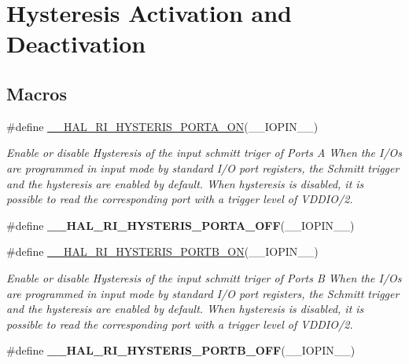 \hypertarget{group___r_i___hyst_config}{\section{Hysteresis Activation and Deactivation}
\label{group___r_i___hyst_config}
}
\subsection*{Macros}
\begin{DoxyCompactItemize}
\item 
\#define \hyperlink{group___r_i___hyst_config_gaae52b285744a36800f8493c58972b8a6}{\-\_\-\-\_\-\-H\-A\-L\-\_\-\-R\-I\-\_\-\-H\-Y\-S\-T\-E\-R\-I\-S\-\_\-\-P\-O\-R\-T\-A\-\_\-\-O\-N}(\-\_\-\-\_\-\-I\-O\-P\-I\-N\-\_\-\-\_\-)
\begin{DoxyCompactList}\small\item\em Enable or disable Hysteresis of the input schmitt triger of Ports A When the I/\-Os are programmed in input mode by standard I/\-O port registers, the Schmitt trigger and the hysteresis are enabled by default. When hysteresis is disabled, it is possible to read the corresponding port with a trigger level of V\-D\-D\-I\-O/2. \end{DoxyCompactList}\item 
\#define {\bfseries \-\_\-\-\_\-\-H\-A\-L\-\_\-\-R\-I\-\_\-\-H\-Y\-S\-T\-E\-R\-I\-S\-\_\-\-P\-O\-R\-T\-A\-\_\-\-O\-F\-F}(\-\_\-\-\_\-\-I\-O\-P\-I\-N\-\_\-\-\_\-)
\item 
\#define \hyperlink{group___r_i___hyst_config_ga839072e04e904822a6083d21ebf5be18}{\-\_\-\-\_\-\-H\-A\-L\-\_\-\-R\-I\-\_\-\-H\-Y\-S\-T\-E\-R\-I\-S\-\_\-\-P\-O\-R\-T\-B\-\_\-\-O\-N}(\-\_\-\-\_\-\-I\-O\-P\-I\-N\-\_\-\-\_\-)
\begin{DoxyCompactList}\small\item\em Enable or disable Hysteresis of the input schmitt triger of Ports B When the I/\-Os are programmed in input mode by standard I/\-O port registers, the Schmitt trigger and the hysteresis are enabled by default. When hysteresis is disabled, it is possible to read the corresponding port with a trigger level of V\-D\-D\-I\-O/2. \end{DoxyCompactList}\item 
\#define {\bfseries \-\_\-\-\_\-\-H\-A\-L\-\_\-\-R\-I\-\_\-\-H\-Y\-S\-T\-E\-R\-I\-S\-\_\-\-P\-O\-R\-T\-B\-\_\-\-O\-F\-F}(\-\_\-\-\_\-\-I\-O\-P\-I\-N\-\_\-\-\_\-)
\item 

\end{DoxyCompactItemize}
